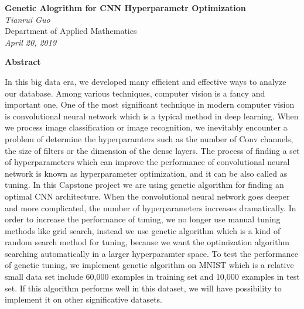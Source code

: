 \documentclass[12pt]{article}
\begin{document}
\begin{titlepage}
   \begin{center}
      \Large\textbf{Genetic Alogrithm for CNN Hyperparametr Optimization}\\
      \large\textit{Tianrui Guo}\\
      \large Department of Applied Mathematics\\
      \large\textit{April 20, 2019}
   \end{center}
\end{titlepage}

\pagebreak
\setlength{\baselineskip}{10mm}
\begin{center}
\LARGE \textbf{Abstract}
\end{center}
In this big data era, we developed many efficient and effective ways to analyze our database. Among various techniques, computer vision is a fancy and important one. One of the most significant technique in modern computer vision is convolutional neural network which is a typical method in deep learning. When we process image classification or image recognition, we inevitably encounter a problem of determine the hyperparamters such as the number of Conv channels, the size of filters or the dimension of the dense layers. The process of finding a set of hyperparameters which can improve the performance of convolutional neural network is known as hyperparameter optimization, and it can be also called as tuning. In this Capstone project we are using genetic algorithm for finding an optimal CNN architecture. When the convolutional neural network goes deeper and more complicated, the number of hyperparameters increases dramatically. In order to increase the performance of tuning, we no longer use manual tuning methods like grid search,  instead we use genetic algorithm which is a kind of random search method for tuning, because we want the optimization algorithm searching automatically in a larger hyperparamter space.  To test the performance of genetic tuning, we implement genetic algorithm on MNIST which is a relative small data set include 60,000 examples in training set and 10,000 examples in test set. If this algorithm performs well in this dataset, we will have possibility to implement it on other significative datasets.\pagebreak
\end{document}
